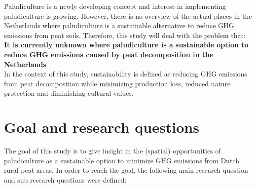 Paludiculture is a newly developing concept and interest in implementing paludiculture is growing. However, there is no overview of the actual places in the Netherlands where paludiculture is a sustainable alternative to reduce GHG emissions from peat soils. Therefore, this study will deal with the problem that:
\\
\textbf{It is currently unknown where paludiculture is a sustainable option to reduce GHG emissions caused by peat decomposition in the Netherlands}
\\
In the context of this study, sustainability is defined as reducing GHG emissions from peat decomposition while minimizing production loss, reduced nature protection and diminishing cultural values. 

\section{Goal and research questions}
The goal of this study is to give insight in the (spatial) opportunities of paludiculture as a sustainable option to minimize GHG emissions from Dutch rural peat areas. In order to reach the goal, the following main research question and sub research questions were defined:

